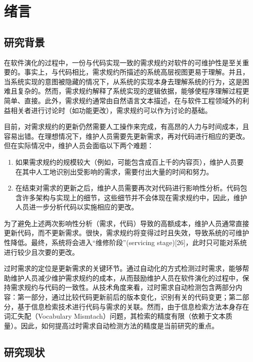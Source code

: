 \chapter{绪言}

\section{研究背景}

在软件演化的过程中，一份与代码实现一致的需求规约对软件的可维护性是至关重要的。事实上，与代码相比，需求规约所描述的系统高层视图更易于理解。并且，当系统实现的意图被隐藏的情况下，从系统的实现本身去理解系统的行为，这是困难且复杂的。然而，需求规约解释了系统实现的逻辑依据，能够使程序理解过程更简单、直接。此外，需求规约通常由自然语言文本描述，在与软件工程领域外的利益相关者进行讨论时（如功能更改），需求规约可以作为讨论的基础。

目前，对需求规约的更新仍然需要人工操作来完成，有高昂的人力与时间成本，且容易出错。在理想情况下，维护人员需要先更新需求，再对代码进行相应的更改。但在实际情况中，维护人员会面临以下两个难题：
\begin{enumerate}
  \item 如果需求规约的规模较大（例如，可能包含成百上千的内容页），维护人员要在其中人工地识别出受影响的需求，需要付出大量的时间和努力。
  \item 在结束对需求的更新之后，维护人员需要再次对代码进行影响性分析。代码包含许多架构与实现上的细节，这些细节并不会体现在需求规约中，因此，维护人员进一步分析代码以实施相应的更改。
\end{enumerate}
为了避免上述两次影响性分析（需求，代码）导致的高额成本，维护人员通常直接更新代码，而不更新需求。很快，需求规约将变得过时且失效，导致系统的可维护性降低。最终，系统将会进入“维修阶段”(servicing stage)[26]，此时只可能对系统进行较少且次要的更改。

过时需求的定位是更新需求的关键环节。通过自动化的方式检测过时需求，能够帮助维护人员减少维护需求规约的成本，从而鼓励维护人员在软件演化的过程中，保持需求规约与代码的一致性。从技术角度来看，过时需求自动检测包含两部分内容：第一部分，通过比较代码更新前后的版本变化，识别有关的代码变更；第二部分，基于信息检索技术进行代码与需求的关联。然而，由于信息检索方法本身存在词汇失配（Vocabulary Mismtach）问题，其检索的精度有限（依赖于文本质量）。因此，如何提高过时需求自动检测方法的精度是当前研究的重点。

\section{研究现状}

